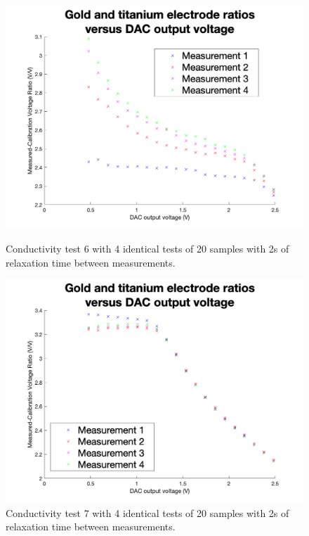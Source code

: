 \begin{figure}[ht]
    \begin{minipage}{0.5\textwidth}
        \centering
        \includegraphics[width=\textwidth]{Figures/Testing/Aus18}
        \caption{Conductivity test 6 with 4 identical tests of 20 samples with 2s of relaxation time between measurements.}
        \label{fig:test13} %
    \end{minipage}
    \begin{minipage}{0.5\textwidth}
        \centering
        \includegraphics[width=\textwidth]{Figures/Testing/Ti18}
        \caption{Conductivity test 7 with 4 identical tests of 20 samples with 2s of relaxation time between measurements.}
        \label{fig:test14} %
    \end{minipage}
\end{figure}

